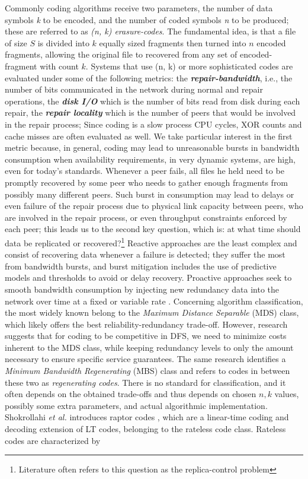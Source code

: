 \documentclass[runningheads]{llncs}
\begin{document}
Commonly coding algorithms receive two parameters, the number of data symbols \textit{k} to be encoded, and the number of coded symbols \textit{n} to be produced; these are referred to as \textit{(n, k) erasure-codes}. The fundamental idea, is that a file of size $S$ is divided into $k$ equally sized fragments then turned into $n$ encoded fragments, allowing the original file to recovered from any set of encoded-fragment with count $k$. Systems that use (n, k) or more sophisticated codes are evaluated under some of the following metrics: the \textbf{\textit{repair-bandwidth}}, i.e., the number of bits communicated in the network during normal and repair operations, the \textbf{\textit{disk I/O}} which is the number of bits read from disk during each repair, the \textbf{\textit{repair locality}} which is the number of peers that would be involved in the repair process; Since coding is a slow process CPU cycles, XOR counts and cache misses are often evaluated as well\cite{fast_coding}. We take particular interest in the first metric because, in general, coding may lead to unreasonable bursts in bandwidth consumption when availability requirements, in very dynamic systems, are high\cite{coding-problems}, even for today's standards. Whenever a peer fails, all files he held need to be promptly recovered by some peer who needs to gather enough fragments from possibly many different peers. Such burst in consumption may lead to delays or even failure of the repair process due to physical link capacity between peers, who are involved in the repair process, or even throughput constraints enforced by each peer; this leads us to the second key question, which is: at what time should data be replicated or recovered?\footnote{Literature often refers to this question as the replica-control problem} Reactive approaches are the least complex and consist of recovering data whenever a failure is detected; they suffer the most from bandwidth bursts, and burst mitigation includes the use of predictive models and thresholds to avoid or delay recovery\cite{lifetime-reactive, efficient-replica-mng-reactive}. Proactive approaches seek to smooth bandwidth consumption by injecting new redundancy data into the network over time at a fixed or variable rate \cite{proactive-rep, reliability-without-availability}. Concerning algorithm classification, the most widely known belong to the \textit{Maximum Distance Separable} (MDS) class, which likely offers the best reliability-redundancy trade-off. However, research \cite{network-coding-for-dss} suggests that for coding to be competitive in DFS, we need to minimize costs inherent to the MDS class, while keeping redundancy levels to only the amount necessary to ensure specific service guarantees. The same research identifies a \textit{Minimum Bandwidth Regenerating} (MBS) class and refers to codes in between these two as \textit{regenerating codes}. There is no standard for classification, and it often depends on the obtained trade-offs and thus depends on chosen $n, k$ values, possibly some extra parameters, and actual algorithmic implementation. Shokrollahi \textit{et al.} introduces raptor codes \cite{raptor-codes}, which are a linear-time coding and decoding extension of LT codes, belonging to the rateless code class. Rateless codes are characterized by 
\end{document}
